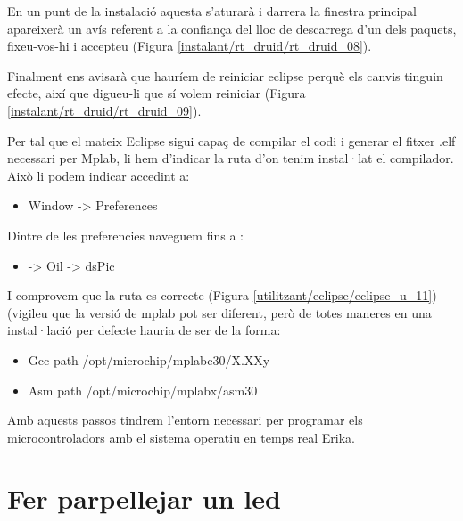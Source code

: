 En un punt de la instalació aquesta s'aturarà i darrera la finestra principal apareixerà un avís referent a la confiança del lloc de descarrega d'un dels paquets, fixeu-vos-hi i accepteu (Figura \ref{instalant/rt_druid/rt_druid_08}).


Finalment ens avisarà que hauríem de reiniciar eclipse perquè els canvis tinguin efecte, així que digueu-li que sí volem reiniciar (Figura \ref{instalant/rt_druid/rt_druid_09}).


\label{gui:lab:ins:rtdruid:path}
Per tal que el mateix Eclipse sigui capaç de compilar el codi i generar el fitxer .elf necessari per Mplab, li hem d'indicar la ruta d'on tenim instal·lat el compilador.
Això li podem indicar accedint a:

\begin{itemize}
	\item Window -\textgreater{} Preferences
\end{itemize}

Dintre de les preferencies naveguem fins a :

\begin{itemize}
	\item \RTDruid -\textgreater{} Oil -\textgreater{} dsPic
\end{itemize}

I comprovem que la ruta es correcte (Figura \ref{utilitzant/eclipse/eclipse_u_11}) (vigileu que la versió de mplab pot ser diferent, però de totes maneres en una instal·lació per defecte hauria de ser de la forma:

\begin{itemize}
	\item Gcc path /opt/microchip/mplabc30/X.XXy
	\item Asm path /opt/microchip/mplabx/asm30
\end{itemize}


Amb aquests passos tindrem l'entorn necessari per programar els microcontroladors amb el sistema operatiu en temps real Erika.

\section{Fer parpellejar un led}

